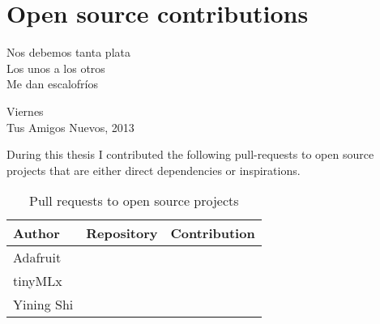 \chapter{Open source contributions}

\epigraph{Nos debemos tanta plata \\ Los unos a los otros \\ Me dan escalofríos}{Viernes \\ Tus Amigos Nuevos, 2013}

During this thesis I contributed the following \glspl{pull-request} to open source projects that are either direct dependencies or inspirations.

\begin{table}[ht]
    \centering
    \begin{tabular}{ | l | l | l |}
        \hline
        Author & Repository & Contribution \\
        \hline
        Adafruit & \cite[Adafruit{\_}SSD1306]{repository-adafruit-adafruit_ssd1306} & \cite[Format binary numbers]{pull-request-adafruit-adafruit_ssd1306} \\
        \hline
        tinyMLx & \cite[TinyMLx Arduino Library]{repository-tinymlx-arduino-library} & \cite[Update architecture name]{pull-request-tinymlx-arduino-library} \\
        \hline
        Yining Shi & \cite[ML for Physical Computing]{repository-yining1023-machine-learning-for-physical-computing} & \cite[Fixed some typos]{pull-request-yining1023-machine-learning-for-physical-computing} \\
        \hline
    \end{tabular}
    \caption{Pull requests to open source projects}
    \label{table:open-source-pull-requests}
\end{table}{}
